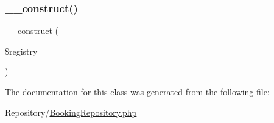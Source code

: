 \subsubsection{\texorpdfstring{\_\_construct()}{\_\_construct()}}
{\footnotesize\ttfamily \+\_\+\+\_\+construct (\begin{DoxyParamCaption}\item[{Registry\+Interface}]{\$registry }\end{DoxyParamCaption})}



The documentation for this class was generated from the following file\+:\begin{DoxyCompactItemize}
\item 
Repository/\mbox{\hyperlink{_booking_repository_8php}{Booking\+Repository.\+php}}\end{DoxyCompactItemize}
